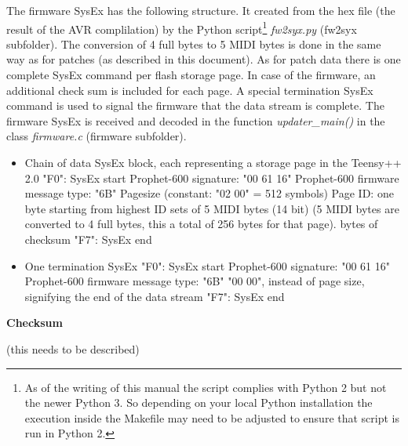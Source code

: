 The firmware SysEx has the following structure. It created from the hex file (the result of the AVR complilation) by the Python script\footnote{As of the writing of this manual the script complies with Python 2 but not the newer Python 3. So depending on your local Python installation the execution inside the Makefile may need to be adjusted to ensure that script is run in Python 2.} \textit{fw2syx.py} (fw2syx subfolder). The conversion of 4 full bytes to 5 MIDI bytes is done in the same way as for patches (as described in this document). As for patch data there is one complete SysEx command per flash storage page. In case of the firmware, an additional check sum is included for each page. A special termination SysEx command is used to signal the firmware that the data stream is complete. The firmware SysEx is received and decoded in the function \textit{updater\_main()} in the class \textit{firmware.c} (firmware subfolder). 

\begin{itemize}
  \item Chain of data SysEx block, each representing a storage page in the Teensy++ 2.0
  \subitem "F0": SysEx start
  \subitem Prophet-600 signature: "00 61 16"
  \subitem Prophet-600 firmware message type: "6B"
  \subitem Pagesize (constant: "02 00" = 512 symbols)
  \subitem Page ID: one byte starting from highest ID
   sets of 5 MIDI bytes (14 bit) (5 MIDI bytes are converted to 4 full bytes, this a total of 256 bytes for that page).
   bytes of checksum
  \subitem "F7": SysEx end
  \item One termination SysEx
  \subitem "F0": SysEx start
  \subitem Prophet-600 signature: "00 61 16"
  \subitem Prophet-600 firmware message type: "6B"
  \subitem "00 00", instead of page size, signifying the end of the data stream
  \subitem "F7": SysEx end  
\end{itemize}


\textbf{Checksum}

(this needs to be described)
